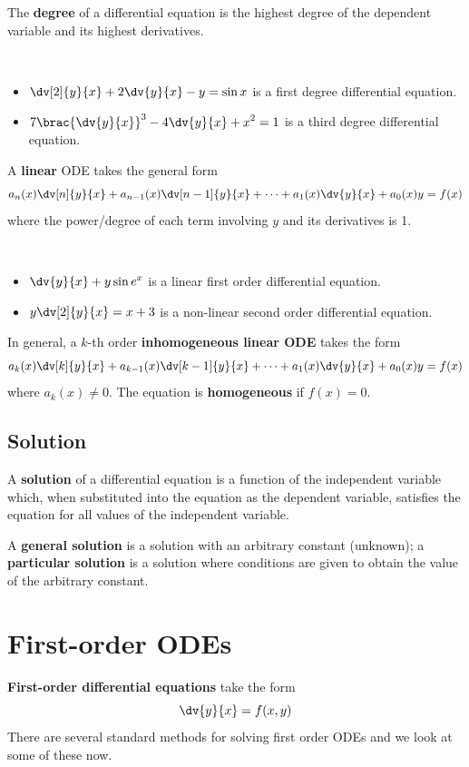 The \textbf{degree} of a differential equation is the highest degree of the dependent variable and its highest derivatives.
\begin{example} \
\begin{itemize}
\item $\displaystyle\dv[2]{y}{x}+2\dv{y}{x}-y=\sin x$ is a first degree differential equation.
\item $\displaystyle7\brac{\dv{y}{x}}^3-4\dv{y}{x}+x^2=1$ is a third degree differential equation.
\end{itemize}
\end{example}

A \textbf{linear} ODE takes the general form
\[ a_n(x)\dv[n]{y}{x}+a_{n-1}(x)\dv[n-1]{y}{x}+\cdots+a_1(x)\dv{y}{x}+a_0(x)y=f(x) \]
where the power/degree of each term involving $y$ and its derivatives is 1.
\begin{example} \
\begin{itemize}
\item $\displaystyle\dv{y}{x}+y\sin e^x$ is a linear first order differential equation.
\item $\displaystyle y\dv[2]{y}{x}=x+3$ is a non-linear second order differential equation.
\end{itemize}
\end{example}

In general, a $k$-th order \textbf{inhomogeneous linear ODE} takes the form
\[ a_k(x)\dv[k]{y}{x} + a_{k-1}(x)\dv[k-1]{y}{x} + \cdots + a_1(x)\dv{y}{x} + a_0(x)y = f(x) \]
where $a_k(x) \neq 0$. The equation is \textbf{homogeneous} if $f(x) = 0$. 

\subsection{Solution}
A \textbf{solution} of a differential equation is a function of the independent variable which, when substituted into the equation as the dependent variable, satisfies the equation for all values of the independent variable.

A \textbf{general solution} is a solution with an arbitrary constant (unknown); a \textbf{particular solution} is a solution where conditions are given to obtain the value of the arbitrary constant.
\pagebreak

\section{First-order ODEs}
\textbf{First-order differential equations} take the form
\[ \dv{y}{x} = f(x,y) \]
There are several standard methods for solving first order ODEs and we look at some of these now.

